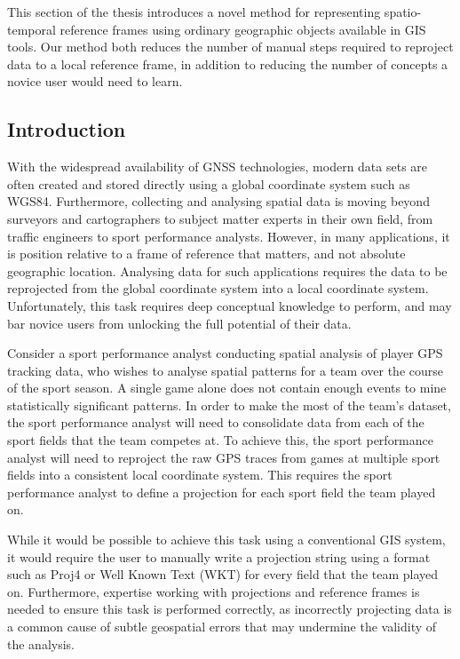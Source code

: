 This section of the thesis introduces a novel method for representing spatio-temporal reference frames using ordinary geographic objects available in GIS tools. Our method both reduces the number of manual steps required to reproject data to a local reference frame, in addition to reducing the number of concepts a novice user would need to learn.


\subsection{Introduction}



With the widespread availability of GNSS technologies, modern data sets are often created and stored directly using a global coordinate system such as WGS84. Furthermore, collecting and analysing spatial data is moving beyond surveyors and cartographers to subject matter experts in their own field, from traffic engineers to sport performance analysts. However, in many applications, it is position relative to a frame of reference that matters, and not absolute geographic location. Analysing data for such applications requires the data to be reprojected from the global coordinate system into a local coordinate system. Unfortunately, this task requires deep conceptual knowledge to perform, and may bar novice users from unlocking the full potential of their data.




Consider a sport performance analyst conducting spatial analysis of player GPS tracking data, who wishes to analyse spatial patterns for a team over the course of the sport season. A single game alone does not contain enough events to mine statistically significant patterns. In order to make the most of the team's dataset, the sport performance analyst will need to consolidate data from each of the sport fields that the team competes at. To achieve this, the sport performance analyst will need to reproject the raw GPS traces from games at multiple sport fields into a consistent local coordinate system. This requires the sport performance analyst to define a projection for each sport field the team played on.

While it would be possible to achieve this task using a conventional GIS system, it would require the user to manually write a projection string using a format such as Proj4 or Well Known Text (WKT) for every field that the team played on. Furthermore, expertise working with projections and reference frames is needed to ensure this task is performed correctly, as incorrectly projecting data is a common cause of subtle geospatial errors that may undermine the validity of the analysis.

